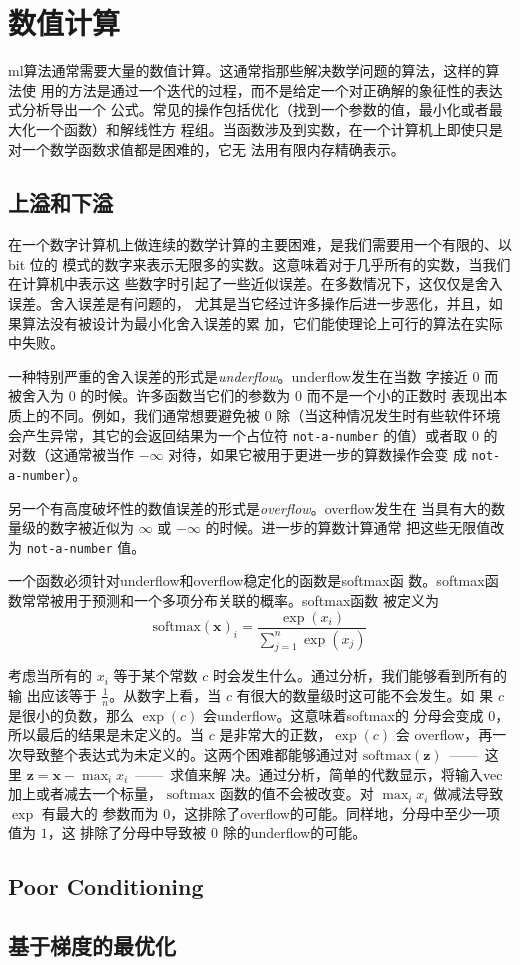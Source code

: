 \chapter{数值计算}
\label{ch:numerical}

\gls*{ml}算法通常需要大量的数值计算。这通常指那些解决数学问题的算法，这样的算法使
用的方法是通过一个迭代的过程，而不是给定一个对正确解的象征性的表达式分析导出一个
公式。常见的操作包括优化（找到一个参数的值，最小化或者最大化一个函数）和解线性方
程组。当函数涉及到实数，在一个计算机上即使只是对一个数学函数求值都是困难的，它无
法用有限内存精确表示。

\section{上溢和下溢}
\label{sec:overflow_and_underflow}

在一个数字计算机上做连续的数学计算的主要困难，是我们需要用一个有限的、以 bit 位的
模式的数字来表示无限多的实数。这意味着对于几乎所有的实数，当我们在计算机中表示这
些数字时引起了一些近似误差。在多数情况下，这仅仅是舍入误差。舍入误差是有问题的，
尤其是当它经过许多操作后进一步恶化，并且，如果算法没有被设计为最小化舍入误差的累
加，它们能使理论上可行的算法在实际中失败。

一种特别严重的舍入误差的形式是\emph{\gls{underflow}}。\gls*{underflow}发生在当数
字接近 $0$ 而被舍入为 $0$ 的时候。许多函数当它们的参数为 $0$ 而不是一个小的正数时
表现出本质上的不同。例如，我们通常想要避免被 $0$ 除（当这种情况发生时有些软件环境
会产生异常，其它的会返回结果为一个占位符 \verb!not-a-number! 的值）或者取 $0$ 的
对数（这通常被当作 $-\infty$ 对待，如果它被用于更进一步的算数操作会变
成 \verb!not-a-number!）。

另一个有高度破坏性的数值误差的形式是\emph{\gls{overflow}}。\gls*{overflow}发生在
当具有大的数量级的数字被近似为 $\infty$ 或 $-\infty$ 的时候。进一步的算数计算通常
把这些无限值改为 \verb!not-a-number! 值。

一个函数必须针对\gls*{underflow}和\gls*{overflow}稳定化的函数是\gls*{softmax}函
数。\gls*{softmax}函数常常被用于预测和一个多项分布关联的概率。\gls*{softmax}函数
被定义为
\begin{equation}
  \mathrm{softmax}(\pmb{x})_i = \frac{\exp(x_i)}{\sum_{j=1}^n\exp(x_j)}
\end{equation}

考虑当所有的 $x_i$ 等于某个常数 $c$ 时会发生什么。通过分析，我们能够看到所有的输
出应该等于 $\frac{1}{n}$。从数字上看，当 $c$ 有很大的数量级时这可能不会发生。如
果 $c$ 是很小的负数，那么 $\exp(c)$ 会\gls*{underflow}。这意味着\gls*{softmax}的
分母会变成 $0$，所以最后的结果是未定义的。当 $c$ 是非常大的正数，$\exp(c)$ 会
\gls*{overflow}，再一次导致整个表达式为未定义的。这两个困难都能够通过对
$\mathrm{softmax}(\pmb{z})$~——~这里 $\pmb{z} = \pmb{x} - \max_ix_i$~——~求值来解
决。通过分析，简单的代数显示，将输入\gls*{vec}加上或者减去一个标量，
$\mathrm{softmax}$ 函数的值不会被改变。对 $\max_ix_i$ 做减法导致 $\exp$ 有最大的
参数而为 $0$，这排除了\gls*{overflow}的可能。同样地，分母中至少一项值为 $1$，这
排除了分母中导致被 $0$ 除的\gls*{underflow}的可能。

\section{Poor Conditioning}
\label{sec:poor_conditioning}

\section{基于梯度的最优化}
\label{sec:gradient-based_optimization}
